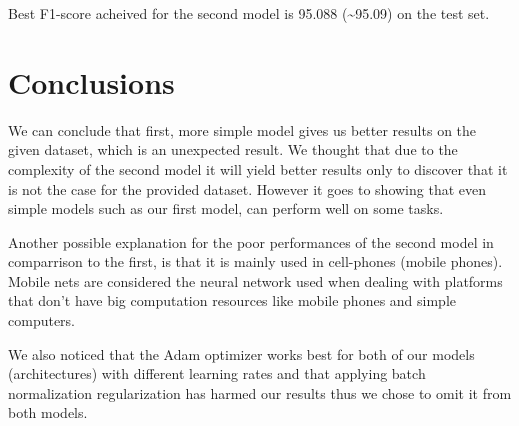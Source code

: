 \documentclass[11pt]{article}
\begin{document}
    Best F1-score acheived for the second model is 95.088
(\textasciitilde{}95.09) on the test set.

    \section{Conclusions}\label{conclusions}

    We can conclude that first, more simple model gives us better results on
the given dataset, which is an unexpected result. We thought that due to
the complexity of the second model it will yield better results only to
discover that it is not the case for the provided dataset. However it
goes to showing that even simple models such as our first model, can
perform well on some tasks.

Another possible explanation for the poor performances of the second
model in comparrison to the first, is that it is mainly used in
cell-phones (mobile phones). Mobile nets are considered the neural
network used when dealing with platforms that don't have big computation
resources like mobile phones and simple computers.

We also noticed that the Adam optimizer works best for both of our
models (architectures) with different learning rates and that applying
batch normalization regularization has harmed our results thus we chose
to omit it from both models.


    
    
    
    
\end{document}
